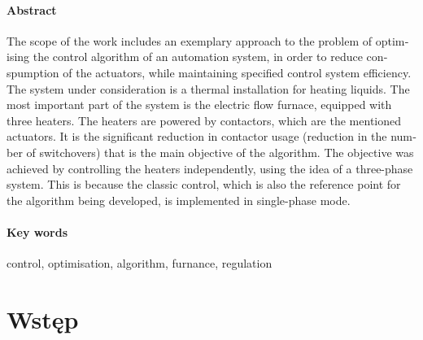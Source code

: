 \documentclass[a4paper,twoside,12pt]{book}
\newcounter{stronyPozaNumeracja}
\begin{document}
\subsubsection*{Abstract}
\begin{otherlanguage}{british}
	The scope of the work includes an exemplary approach to the problem of optimising the control algorithm of an automation system, in order to reduce conspumption of the actuators, while maintaining specified control system efficiency. The system under consideration is a thermal installation for heating liquids. The most important part of the system is the electric flow furnace, equipped with three heaters. The heaters are powered by contactors, which are the mentioned actuators. It is the significant reduction in contactor usage (reduction in the number of switchovers) that is the main objective of the algorithm. The objective was achieved by controlling the heaters independently, using the idea of a three-phase system. This is because the classic control, which is also the reference point for the algorithm being developed, is implemented in single-phase mode.
\end{otherlanguage}
\subsubsection*{Key words}
\begin{otherlanguage}{british}
	control, optimisation, algorithm, furnance, regulation
\end{otherlanguage}




\tableofcontents

\setcounter{stronyPozaNumeracja}{\value{page}}
\mainmatter
\pagestyle{empty}

\cleardoublepage

\pagestyle{NumeryStronNazwyRozdzialow}


\chapter{Wstęp}
\label{ch:01}
\end{document}
